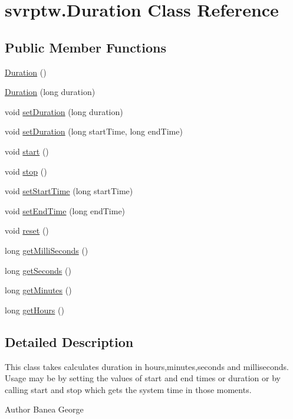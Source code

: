 \hypertarget{classsvrptw_1_1_duration}{}\section{svrptw.\+Duration Class Reference}
\label{classsvrptw_1_1_duration}
\subsection*{Public Member Functions}
\begin{DoxyCompactItemize}
\item 
\hyperlink{classsvrptw_1_1_duration_a884e1e0731c7e821ea5a68ae9f2c816a}{Duration} ()
\item 
\hyperlink{classsvrptw_1_1_duration_a0b93fcf045d5f7a2a6ac34871d0a8965}{Duration} (long duration)
\item 
void \hyperlink{classsvrptw_1_1_duration_a2e7467de26b557667493ba58b4ab7320}{set\+Duration} (long duration)
\item 
void \hyperlink{classsvrptw_1_1_duration_af0596f7491df762b7a52edc51705c1df}{set\+Duration} (long start\+Time, long end\+Time)
\item 
void \hyperlink{classsvrptw_1_1_duration_ab259904a807a873bdc94545ffc959dfe}{start} ()
\item 
void \hyperlink{classsvrptw_1_1_duration_a2c5297e56fc6884895b384c6860a1512}{stop} ()
\item 
void \hyperlink{classsvrptw_1_1_duration_a773959d9b8ce83dd1702ccb2c6337c28}{set\+Start\+Time} (long start\+Time)
\item 
void \hyperlink{classsvrptw_1_1_duration_a779171bd93aec0867304660663d30d92}{set\+End\+Time} (long end\+Time)
\item 
void \hyperlink{classsvrptw_1_1_duration_a52ea420d400f5c976e5e12f0e94310ac}{reset} ()
\item 
long \hyperlink{classsvrptw_1_1_duration_a6d9f52a1f32f642eac321ad39639ce32}{get\+Milli\+Seconds} ()
\item 
long \hyperlink{classsvrptw_1_1_duration_a9db7a1d9063b2b9f903f72caefc03663}{get\+Seconds} ()
\item 
long \hyperlink{classsvrptw_1_1_duration_a90d4193c8ee7706f483b560156c99c8e}{get\+Minutes} ()
\item 
long \hyperlink{classsvrptw_1_1_duration_a1bd63df32f12ea377580dac255e7653f}{get\+Hours} ()
\end{DoxyCompactItemize}


\subsection{Detailed Description}
This class takes calculates duration in hours,minutes,seconds and milliseconds. Usage may be by setting the values of start and end times or duration or by calling start and stop which gets the system time in those moments. \begin{DoxyAuthor}{Author}
Banea George 
\end{DoxyAuthor}


